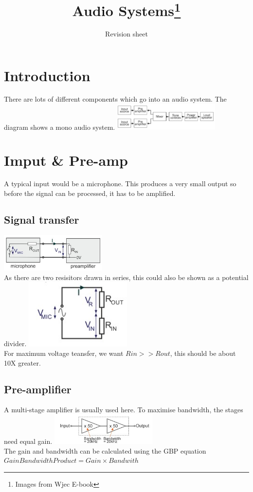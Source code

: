 \documentclass[a4paper, 11pt, twocolumn]{article}
\title{Audio Systems\footnote{Images from Wjec E-book}}
\author{Revision sheet}
\date{}
\begin{document}
    
    \maketitle

    \section{Introduction}
    There are lots of different components which go into an audio system. The diagram shows a mono audio system.
    \includegraphics[width=0.4\textwidth]{monoBloc.jpg} \\
    \section{Imput \& Pre-amp}
    A typical input would be a microphone. This produces a very small output so before the signal can be processed, it has to be amplified.
    \subsection{Signal transfer}
    \includegraphics[width=0.4\textwidth]{sigTrans1.jpg} \\
    As there are two resisitors drawn in series, this could also be shown as a potential divider.
    \includegraphics[width=0.4\textwidth]{sigTrans2.jpg} \\
    For maximum voltage teansfer, we want $Rin>>Rout$, this should be about 10X greater.
    \subsection{Pre-amplifier}
    A multi-stage amplifier is usually used here. To maximise bandwidth, the stages need equal gain.
    \includegraphics[width=0.4\textwidth]{msAmp.jpg} \\
    The gain and bandwidth can be calculated using the GBP equation
    $Gain Bandwidth Product = Gain \times Bandwith$
\end{document}
